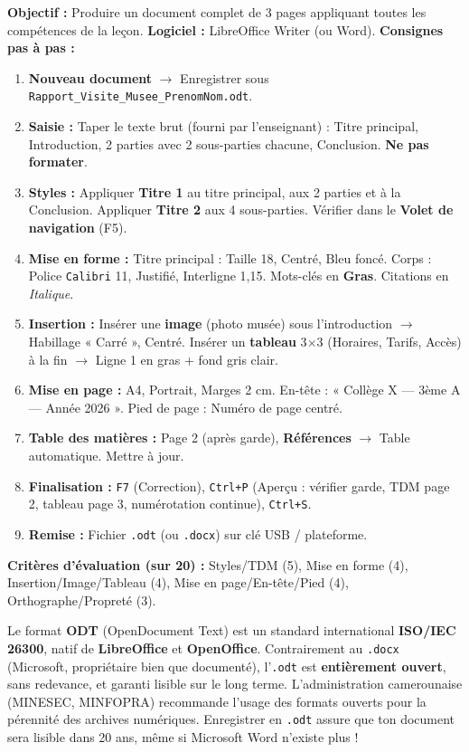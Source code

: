 \documentclass[11pt]{article}
\begin{document}
\begin{experience}
\textbf{Objectif :} Produire un document complet de 3 pages appliquant toutes les compétences de la leçon.
\textbf{Logiciel :} LibreOffice Writer (ou Word).
\textbf{Consignes pas à pas :}
\begin{enumerate}
  \item \textbf{Nouveau document} $\rightarrow$ Enregistrer sous \texttt{Rapport\_Visite\_Musee\_PrenomNom.odt}.
  \item \textbf{Saisie :} Taper le texte brut (fourni par l'enseignant) : Titre principal, Introduction, 2 parties avec 2 sous-parties chacune, Conclusion. \textbf{Ne pas formater}.
  \item \textbf{Styles :} Appliquer \textbf{Titre 1} au titre principal, aux 2 parties et à la Conclusion. Appliquer \textbf{Titre 2} aux 4 sous-parties. Vérifier dans le \textbf{Volet de navigation} (F5).
  \item \textbf{Mise en forme :} Titre principal : Taille 18, Centré, Bleu foncé. Corps : Police \texttt{Calibri} 11, Justifié, Interligne 1,15. Mots-clés en \textbf{Gras}. Citations en \emph{Italique}.
  \item \textbf{Insertion :} Insérer une \textbf{image} (photo musée) sous l'introduction $\rightarrow$ Habillage « Carré », Centré. Insérer un \textbf{tableau} 3$\times$3 (Horaires, Tarifs, Accès) à la fin $\rightarrow$ Ligne 1 en gras + fond gris clair.
  \item \textbf{Mise en page :} A4, Portrait, Marges 2 cm. En-tête : « Collège X — 3ème A — Année 2026 ». Pied de page : Numéro de page centré.
  \item \textbf{Table des matières :} Page 2 (après garde), \textbf{Références} $\rightarrow$ Table automatique. Mettre à jour.
  \item \textbf{Finalisation :} \texttt{F7} (Correction), \texttt{Ctrl+P} (Aperçu : vérifier garde, TDM page 2, tableau page 3, numérotation continue), \texttt{Ctrl+S}.
  \item \textbf{Remise :} Fichier \texttt{.odt} (ou \texttt{.docx}) sur clé USB / plateforme.
\end{enumerate}
\textbf{Critères d'évaluation (sur 20) :} Styles/TDM (5), Mise en forme (4), Insertion/Image/Tableau (4), Mise en page/En-tête/Pied (4), Orthographe/Propreté (3).
\end{experience}

\begin{savaistu}
Le format \textbf{ODT} (OpenDocument Text) est un standard international \textbf{ISO/IEC 26300}, natif de \textbf{LibreOffice} et \textbf{OpenOffice}. Contrairement au \texttt{.docx} (Microsoft, propriétaire bien que documenté), l'\texttt{.odt} est \textbf{entièrement ouvert}, sans redevance, et garanti lisible sur le long terme. L'administration camerounaise (MINESEC, MINFOPRA) recommande l'usage des formats ouverts pour la pérennité des archives numériques. Enregistrer en \texttt{.odt} assure que ton document sera lisible dans 20 ans, même si Microsoft Word n'existe plus !
\end{savaistu}
\end{document}
